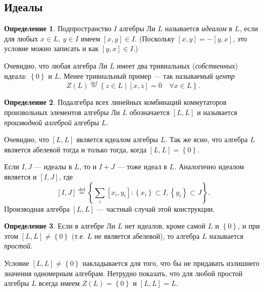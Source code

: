 \documentclass[a4paper, 12pt]{article}
\theoremstyle{definition}
\newtheorem{definition}{Определение}[section]
\begin{document}
\subsection{Идеалы}

\begin{definition}
    Подпространство \({ I }\) алгебры Ли \({ L }\) называется \textit{идеалом} в \({ L }\), если для любых \({ x \in L,\: y \in I }\) имеем \({ [x, y] \in I }\). (Поскольку \({ [x, y] = -[y, x] }\), это условие можно записать и как \({ [y, x] \in I }\).)
\end{definition}

Очевидно, что любая алгебра Ли \({ L }\) имеет два тривиальных (\textit{собственных}) идеала: \({ \left\{ 0 \right\} }\) и \({ L }\). Менее тривиальный пример --- так называемый \textit{центр}
\[
    Z(L) \overset{\text{def}}= \left\{ z \in L \mid [x, z] = 0 \quad \forall x \in L \right\}.
\]

\begin{definition}
    Подалгебра всех линейных комбинаций коммутаторов произвольных элементов алгебры Ли \({ L }\) обозначается \({ [L, L] }\) и называется \textit{производной алгеброй} алгебры \({ L }\).
\end{definition}

Очевидно, что \({ [L, L] }\) является идеалом алгебры \({ L }\). Так же ясно, что алгебра \({ L }\) является абелевой тогда и только тогда, когда \({ [L, L] = \left\{ 0 \right\} }\).

Если \({ I, J }\) --- идеалы в \({ L }\), то и \({ I + J }\) --- тоже идеал в \({ L }\). Аналогично идеалом является и \({ [I, J] }\), где
\[
    [I, J] \overset{\text{def}}= \left\{ \sum_i [x_i, y_i] : \left\{ x_i \right\} \subset I, \left\{ y_i \right\} \subset J \right\}.
\]
Производная алгебра \({ [L, L] }\) --- частный случай этой конструкции.

\begin{definition}
    Если в алгебре Ли \({ L }\) нет идеалов, кроме самой \({ L }\) и \({ \left\{ 0 \right\} }\), и при этом \({ [L, L] \neq \left\{ 0 \right\} }\) (т.е. \({ L }\) не является абелевой), то алгебра \({ L }\) называется \textit{простой}.
\end{definition}

Условие \({ [L, L] \neq \left\{ 0 \right\} }\) накладывается для того, что бы не придавать излишнего значения одномерным алгебрам. Нетрудно показать, что для любой простой алгебры \({ L }\) всегда имеем \({ Z(L) = \left\{ 0 \right\} }\) и \({ [L, L] = L }\).
\end{document}

